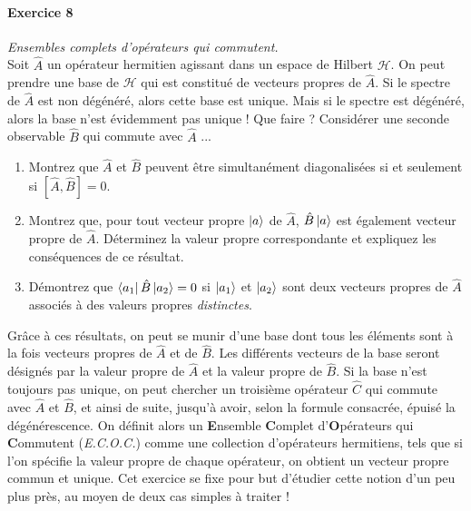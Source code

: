 $ $

\paragraph{Exercice 8} \textit{Ensembles complets d'opérateurs qui commutent.}\\
Soit $\hat A$ un opérateur hermitien agissant dans un espace de Hilbert $\mathcal{H}$. On peut prendre une base de $\mathcal{H}$ qui est constitué de vecteurs propres de $\hat A$. Si le spectre de $\hat A$ est non dégénéré, alors cette base est unique. Mais si le spectre est dégénéré, alors la base n'est évidemment pas unique ! Que faire ? Considérer une seconde observable $\hat B$ qui commute avec $\hat A$ ...
\begin{enumerate}
\item Montrez que $\hat A$ et $\hat B$ peuvent être simultanément diagonalisées si et seulement si $[\hat A,\hat B]=0$.
\item Montrez que, pour tout vecteur propre $\ket{a}$ de $\hat A$, $\hat B\ket{a}$ est également vecteur propre de $\hat A$.
Déterminez la valeur propre correspondante et expliquez les conséquences de ce résultat. 
\item Démontrez que $\bra{a_1}\hat B\ket{a_2}=0$ si $\ket{a_1}$ et $\ket{a_2}$ sont deux vecteurs propres de $\hat A$ associés à des valeurs propres \textit{distinctes}. 
\end{enumerate}

Grâce à ces résultats, on peut se munir d'une base dont tous les éléments sont à la fois vecteurs propres de $\hat A$ et de $\hat B$. Les différents vecteurs de la base seront désignés par la valeur propre de $\hat A$ et la valeur propre de $\hat B$. Si la base n'est toujours pas unique, on peut chercher un troisième opérateur $\hat C$ qui commute avec $\hat A$ et $\hat B$, et ainsi de suite, jusqu'à avoir, selon la formule consacrée, épuisé la dégénérescence. On définit alors un \textbf{E}nsemble \textbf{C}omplet d'\textbf{O}pérateurs qui \textbf{C}ommutent (\textit{E.C.O.C.}) comme une collection d'opérateurs hermitiens, tels que si l'on spécifie la valeur propre de chaque opérateur, on obtient un vecteur propre commun et unique. Cet exercice se fixe pour but d'étudier cette notion d'un peu plus près, au moyen de deux cas simples à traiter ! 

%

